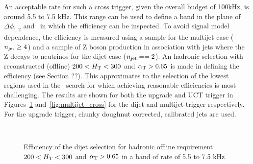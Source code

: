 An acceptable rate for such a cross trigger, given the overall budget of 100kHz, is 
around 5.5 to 7.5 kHz. This range can be used to define a band in the plane of $\Delta\phi_{1,2}$
and \scalht~in which the efficiency can be inspected. To avoid signal model dependence, the 
efficiency is measured using a \ttbar sample for the multijet case ($n_{\mathrm{jet}} \ge 4$) and a sample  
of Z boson production in association with jets where the Z decays to neutrinos for the 
dijet case ($n_{\mathrm{jet}} == 2$). An hadronic selection with reconstructed (offline) $200 < \mbox{$H_\text{T}$} < 300$ 
and $\alpha_{\text{T}} > 0.65$ is made in defining the efficiency (see Section ??). This approximates to the selection
of the lowest \scalht regions used in the \alphat~search for which achieving reasonable efficiencies is most challenging.
The results are shown for both the upgrade and UCT trigger in Figures~\ref{fig:dijet_cross} and~\ref{fig:multijet_cross} 
for the dijet and multijet trigger respectively. For the upgrade trigger, chunky doughnut corrected, calibrated jets are used.

\begin{figure}
\centering
	~
	\caption{Efficiency of the dijet selection for hadronic offline requirement $200 < \mbox{$H_\text{T}$} < 300$ and $\alpha_{\text{T}} > 0.65$
	in a band of rate of 5.5 to 7.5 kHz}
	    \label{fig:dijet_cross}
\end{figure}

